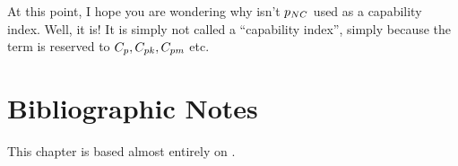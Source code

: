 \begin{remark}
At this point, I hope you are wondering why isn't $p_{NC}$ used as a capability index. 
Well, it is! 
It is simply not called a ``capability index'', simply because the term is reserved to $C_p, C_{pk}, C_{pm}$ etc.
\end{remark}



\section{Bibliographic Notes}
This chapter is based almost entirely on \cite{montgomery_introduction_2007}.